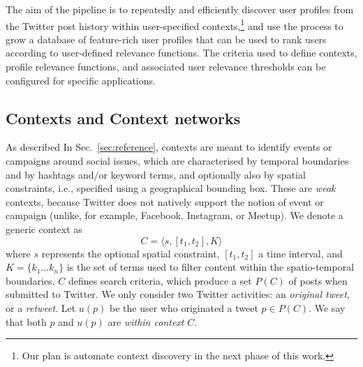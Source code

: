 \documentclass[runningheads]{llncs}
\begin{document}

The aim of the pipeline is to repeatedly and efficiently discover user profiles from the Twitter post history within user-specified contexts,\footnote{Our plan is automate context discovery in the next phase of this work.} and use the process to grow a database of feature-rich user profiles that can be used to rank users according to user-defined relevance functions. 
The criteria used to define contexts, profile relevance functions, and associated user relevance thresholds can be configured for specific applications.

\subsection{Contexts and Context networks} \label{sec:contexts}

As described In Sec.~\ref{sec:reference}, contexts are meant to identify events or campaigns around social issues, which are characterised by temporal boundaries and by hashtags and/or keyword terms, and optionally also by spatial constraints, i.e., specified using a geographical bounding box.
These are \textit{weak} contexts, because Twitter does not natively support the notion of event or campaign (unlike, for example, Facebook, Instagram, or Meetup).
We denote a generic context as
\begin{equation}
C = \langle s, [t_1, t_2], K \rangle 
\label{eq:context}
\end{equation}
where $s$ represents the optional spatial constraint, $[t_1, t_2]$ a time interval, and $K = \{ k_1 \dots k_n\}$ is the set of terms used to filter content within the spatio-temporal boundaries.
%
$C$ defines search criteria, which produce a set $P(C)$ of posts when submitted to Twitter.
We only consider two Twitter activities: an \textit{original tweet}, or a \textit{retweet}.
Let $u(p)$ be the user who originated a tweet $p \in P(C)$.
We say that both $p$ and $u(p)$ are \textit{within context} $C$.
\end{document}
